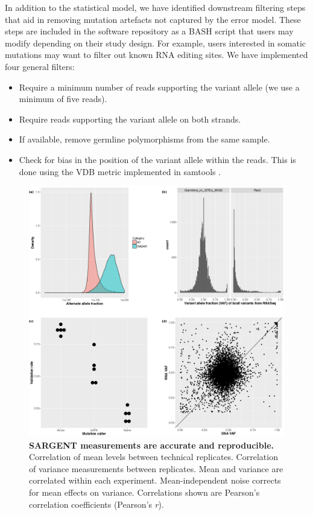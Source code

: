 In addition to the statistical model, we have identified downstream filtering steps that aid in removing mutation artefacts not captured by the error model. These steps are included in the software repository as a BASH script that users may modify depending on their study design. For example, users interested in somatic mutations may want to filter out known RNA editing sites. We have implemented four general filters:
\begin{itemize}
   \item Require a minimum number of reads supporting the variant allele (we use a minimum of five reads).
   \item Require reads supporting the variant allele on both strands.
   \item If available, remove germline polymorphisms from the same sample.
   \item Check for bias in the position of the variant allele within the reads. This is done using the VDB metric implemented in samtools \cite{li2009b}.
\end{itemize}

\begin{figure}[t!]  
    \centering
    \includegraphics[width=\linewidth]{figures/appendix/appendix_figure1.png}
    \caption[SARGENT measurements are accurate and reproducible.]{%
        \textbf{SARGENT measurements are accurate and reproducible.}
        Correlation of mean levels between technical replicates.
        Correlation of variance measurements between replicates.
        Mean and variance are correlated within each experiment.
        Mean-independent noise corrects for mean effects on variance. Correlations shown are Pearson’s correlation coefficients (Pearson’s \textit{r}). 
    }
    \label{fig:cas_figure2}
\end{figure}


